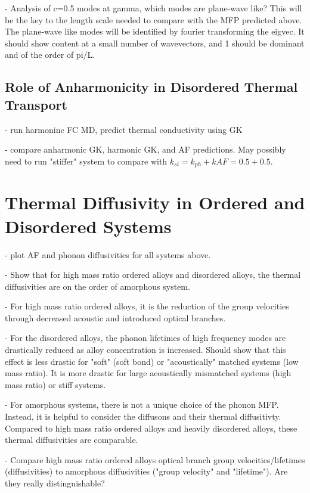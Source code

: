 \documentclass[aps,prb,preprint,superscriptaddress,amsmath,amssymb,floatfix]{revtex4}
\begin{document}
- Analysis of c=0.5 modes at gamma, which modes are plane-wave like? This will be the key to the length scale needed to compare with the MFP predicted above. The plane-wave like modes will be identified by fourier transforming the eigvec.  It should show content at a small number of wavevectors, and 1 should be dominant and of the order of pi/L. 

\subsection{\label{S-Motivation-Amorphous}Role of Anharmonicity in Disordered Thermal Transport}

- run harmoninc FC MD, predict thermal conductivity using GK

- compare anharmonic GK, harmonic GK, and AF predictions. May possibly need to run "stiffer" system to compare with $k_{si} = k_{ph} + k{AF} = 0.5+0.5$. 

\section{\label{S-Motivation} Thermal Diffusivity in Ordered and Disordered Systems}



- plot AF and phonon diffusivities for all systems above.  

- Show that for high mass ratio ordered alloys and disordered alloys, the thermal diffusivities are on the order of amorphous system. 

- For high mass ratio ordered alloys, it is the reduction of the group velocities through decreased acoustic and introduced optical branches. 

- For the disordered alloys, the phonon lifetimes of high frequency modes are drastically reduced as alloy concentration is increased.  Should show that this effect is less drastic for "soft" (soft bond) or "acoustically" matched systems (low mass ratio). It is more drastic for large acoustically mismatched systems (high mass ratio) or stiff systems.

- For amorphous systems, there is not a unique choice of the phonon MFP. Instead, it is helpful to consider the diffusons and their thermal diffusitivty. Compared to high mass ratio ordered alloys and heavily disordered alloys, these thermal diffusivities are comparable.  

- Compare high mass ratio ordered alloys optical branch group velocities/lifetimes (diffusivities) to amorphous diffusivities ("group velocity" and "lifetime"). Are they really distinguishable?
\end{document}

